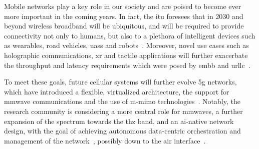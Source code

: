 
Mobile networks play a key role in our society and are poised to become ever more important in the coming years. In fact, the \gls{itu} foresees that in 2030 and beyond wireless broadband will be ubiquitous, and will be required to provide connectivity not only to humans, but also to a plethora of intelligent devices such as wearables, road vehicles, \glspl{uas} and robots~\cite{imt2030}. Moreover, novel use cases such as holographic communications, \gls{xr} and tactile applications will further exacerbate the throughput and latency requirements which were posed by \gls{embb} and \gls{urllc}~\cite{itu-r-2083}. 


To meet these goals, future cellular systems will 
further evolve \gls{5g} 
networks,
which have introduced a flexible, virtualized architecture, the support for \gls{mmwave} communications and the use of \gls{m-mimo} technologies~\cite{ghosh20195g}. Notably, the research community is considering a more central role for \glspl{mmwave}, a further expansion of the spectrum towards the \gls{thz} band, and an \gls{ai}-native network design, with the goal of achieving autonomous data-centric orchestration and management of the network~\cite{polese20216g}, possibly down to the air interface~\cite{hoydis2021toward}.

